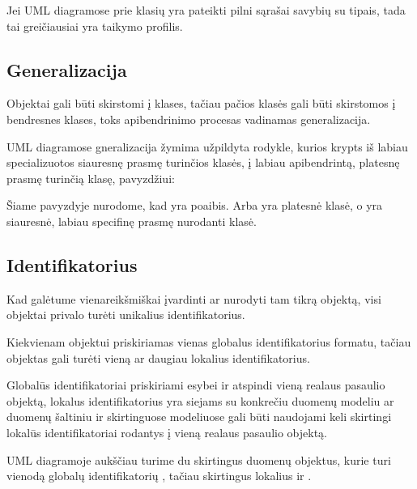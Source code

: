 \documentclass[letterpaper,10pt,lithuanian]{sphinxmanual}
\begin{document}
\sphinxAtStartPar
Jei UML diagramose prie klasių yra pateikti pilni sąrašai savybių su tipais,
tada tai greičiausiai yra taikymo profilis.


\subsection{Generalizacija}
\label{\detokenize{modelis:generalizacija}}
\sphinxAtStartPar
Objektai gali būti skirstomi į klases, tačiau pačios klasės gali būti
skirstomos į bendresnes klases, toks apibendrinimo procesas vadinamas
generalizacija.

\sphinxAtStartPar
UML diagramose gneralizacija žymima užpildyta rodykle, kurios krypts iš labiau
specializuotos siauresnę prasmę turinčios klasės, į labiau apibendrintą,
platesnę prasmę turinčią klasę, pavyzdžiui:

\sphinxAtStartPar
Šiame pavyzdyje nurodome, kad  yra  poaibis. Arba
 yra platesnė klasė, o  yra siauresnė, labiau
specifinę prasmę nurodanti klasė.


\subsection{Identifikatorius}
\label{\detokenize{modelis:identifikatorius}}
\sphinxAtStartPar
Kad galėtume vienareikšmiškai įvardinti ar nurodyti tam tikrą objektą, visi
objektai privalo turėti unikalius identifikatorius.

\sphinxAtStartPar
Kiekvienam objektui priskiriamas vienas globalus identifikatorius  formatu, tačiau objektas gali turėti vieną ar daugiau lokalius
identifikatorius.

\sphinxAtStartPar
Globalūs identifikatoriai priskiriami esybei ir atspindi vieną realaus pasaulio
objektą, lokalus identifikatorius yra siejams su konkrečiu duomenų modeliu ar
duomenų šaltiniu ir skirtinguose modeliuose gali būti naudojami keli skirtingi
lokalūs identifikatoriai rodantys į vieną realaus pasaulio objektą.

\sphinxAtStartPar
UML diagramoje aukščiau turime du skirtingus duomenų objektus, kurie turi
vienodą globalų identifikatorių , tačiau
skirtingus lokalius  ir .
\end{document}

